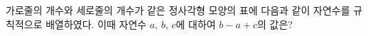 가로줄의 개수와 세로줄의 개수가 같은 정사각형 모양의 표에 다음과 같이 자연수를 규칙적으로 배열하였다. 이때 자연수 $a$, $b$, $c$에 대하여 $b-a+c$의 값은?
\par\smallskip\begin{center}\resizebox{\ifdim\width>\linewidth\linewidth\else\width\fi}{!}{}\end{center}
